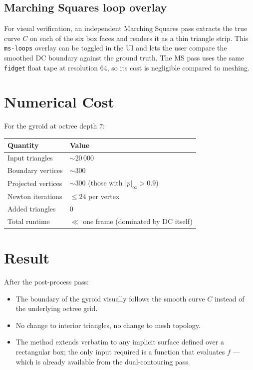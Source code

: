 \documentclass[11pt]{article}
\begin{document}
\subsection{Marching Squares loop overlay}

For visual verification, an independent Marching Squares pass extracts
the true curve $C$ on each of the six box faces and renders it as a thin
triangle strip.  This \texttt{ms-loops} overlay can be toggled in the UI
and lets the user compare the smoothed DC boundary against the ground
truth.  The MS pass uses the same \texttt{fidget} float tape at
resolution $64$, so its cost is negligible compared to meshing.

\section{Numerical Cost}

For the gyroid at octree depth $7$:
\begin{center}
\begin{tabular}{ll}
\toprule
Quantity & Value \\
\midrule
Input triangles     & $\sim 20\,000$ \\
Boundary vertices   & $\sim 300$ \\
Projected vertices  & $\sim 300$ (those with $|p|_\infty > 0.9$) \\
Newton iterations   & $\leq 24$ per vertex \\
Added triangles     & $0$ \\
Total runtime       & $\ll$ one frame (dominated by DC itself) \\
\bottomrule
\end{tabular}
\end{center}

\section{Result}

After the post-process pass:
\begin{itemize}
  \item The boundary of the gyroid visually follows the smooth curve $C$
        instead of the underlying octree grid.
  \item No change to interior triangles, no change to mesh topology.
  \item The method extends verbatim to any implicit surface defined over
        a rectangular box; the only input required is a function that
        evaluates $f$ --- which is already available from the
        dual-contouring pass.
\end{itemize}
\end{document}

